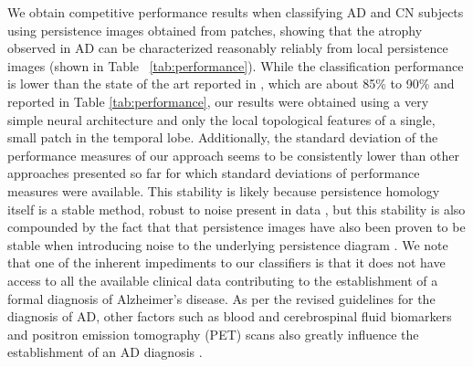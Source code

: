 \documentclass{article}
\begin{document}
We obtain competitive performance results when classifying AD and CN subjects using persistence
images obtained from patches, showing that the atrophy observed in AD can be characterized
reasonably reliably from local persistence images (shown in Table ~\ref{tab:performance}). While the
classification performance is lower than the state of the art reported in \citep{liu2018anatomical},
which are about 85\% to 90\% and reported in Table \ref{tab:performance}, our results were obtained
using a very simple neural architecture and only the local topological features of a single, small
patch in the temporal lobe. Additionally, the standard deviation of the performance measures of our
approach seems to be consistently lower than other approaches presented so far for which standard
deviations of performance measures were available. This stability is likely because persistence
homology itself is a stable method, robust to noise present in data \citep{cohen2007stability}, but
this stability is also compounded by the fact that that persistence images have also been proven to
be stable when introducing noise to the underlying persistence diagram \citep{adams2017persistence}.
We note that one of the inherent impediments to our classifiers is that it does not have access to
all the available clinical data contributing to the establishment of a formal diagnosis of
Alzheimer's disease. As per the revised guidelines for the diagnosis of AD, other factors such as
blood and cerebrospinal fluid biomarkers and positron emission tomography (PET) scans also greatly
influence the establishment of an AD diagnosis \citep{mckhann2011diagnosis}.
\end{document}
